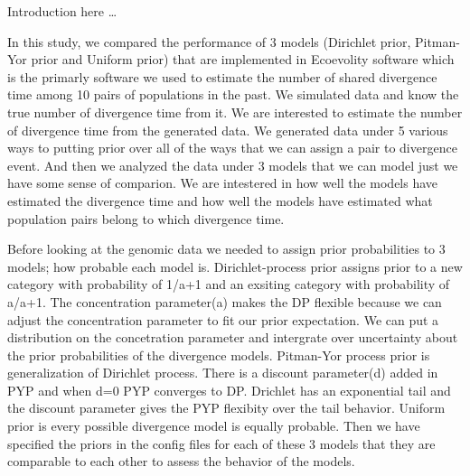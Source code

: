 Introduction here \ldots

In this study, we compared the performance of 3 models (Dirichlet prior, Pitman-Yor prior and Uniform prior) 
that are implemented in Ecoevolity software which is the primarly software we used to estimate the number of shared divergence time 
among 10 pairs of populations in the past. We simulated data and know the true number of divergence time from it. We are interested 
to estimate the number of divergence time from the generated data. We generated data under 5 various ways to putting prior over all
of the ways that we can assign a pair to divergence event. And then we analyzed the data under 3 models that we can model  
just we have some sense of comparion. We are intestered in how well the models have estimated the divergence time and how well 
the models have estimated what population pairs belong to which divergence time. 

Before looking at the genomic data we needed to assign prior probabilities to 3 models; how probable each model is. Dirichlet-process prior 
assigns prior to a new category with probability of 1/a+1 and an exsiting category with probability of a/a+1. The concentration parameter(a) 
makes the DP flexible because we can adjust the concentration parameter to fit our prior expectation. We can put a distribution on the 
concetration parameter and intergrate over uncertainty about the prior probabilities of the divergence models. Pitman-Yor process prior is 
generalization of Dirichlet process. There is a discount parameter(d) added in PYP and when d=0 PYP converges to DP. Drichlet has an exponential tail 
and the discount parameter gives the PYP flexibity over the tail behavior. Uniform prior is every possible divergence model is equally probable. 
Then we have specified the priors in the config files for each of these 3 models that they are comparable to each other to assess the behavior of the models. 

